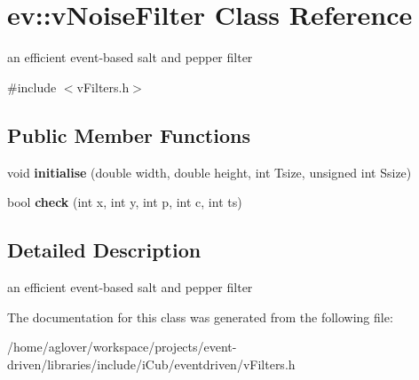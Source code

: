 \hypertarget{classev_1_1vNoiseFilter}{}\section{ev\+:\+:v\+Noise\+Filter Class Reference}
\label{classev_1_1vNoiseFilter}


an efficient event-\/based salt and pepper filter  




{\ttfamily \#include $<$v\+Filters.\+h$>$}

\subsection*{Public Member Functions}
\begin{DoxyCompactItemize}
\item 
void {\bfseries initialise} (double width, double height, int Tsize, unsigned int Ssize)\hypertarget{classev_1_1vNoiseFilter_af7c6cf000f7ed7193d160debac4e6879}{}\label{classev_1_1vNoiseFilter_af7c6cf000f7ed7193d160debac4e6879}

\item 
bool {\bfseries check} (int x, int y, int p, int c, int ts)\hypertarget{classev_1_1vNoiseFilter_a71ed5ded4f59d1c3180b0f5e5a021547}{}\label{classev_1_1vNoiseFilter_a71ed5ded4f59d1c3180b0f5e5a021547}

\end{DoxyCompactItemize}


\subsection{Detailed Description}
an efficient event-\/based salt and pepper filter 

The documentation for this class was generated from the following file\+:\begin{DoxyCompactItemize}
\item 
/home/aglover/workspace/projects/event-\/driven/libraries/include/i\+Cub/eventdriven/v\+Filters.\+h\end{DoxyCompactItemize}
